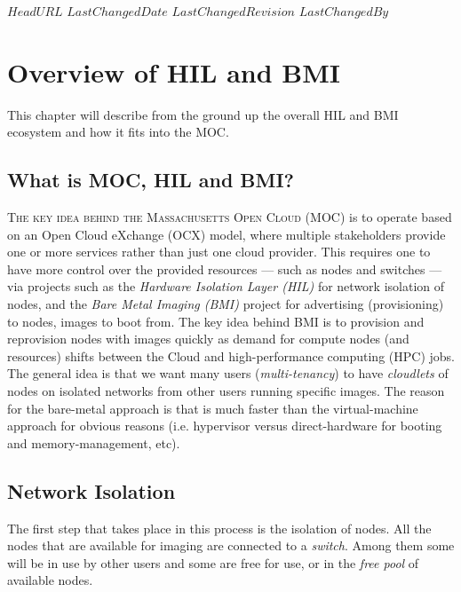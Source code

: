 \svnidlong
{$HeadURL$}
{$LastChangedDate$}
{$LastChangedRevision$}
{$LastChangedBy$}

\chapter{Overview of HIL and BMI}

\begin{introduction}
  This chapter will describe from the ground up the overall HIL and BMI ecosystem and how it fits into the MOC.
\end{introduction}


\section{What is MOC, HIL and BMI?}

\lettrine[nindent=-1pt]{T}{he key idea behind the Massachusetts Open Cloud (MOC)} is to operate based on an Open Cloud eXchange (OCX) model, where multiple stakeholders provide one or more services rather than just one cloud provider.  This requires one to have more control over the provided resources --- such as nodes and switches --- via projects such as the \emph{Hardware Isolation Layer (HIL)} for network isolation of nodes, and the \emph{Bare Metal Imaging (BMI)} project for advertising (provisioning) to nodes, images to boot from.  The key idea behind BMI is to provision and reprovision nodes with images quickly as demand for compute nodes (and resources) shifts between the Cloud and high-performance computing (HPC) jobs.  \\ %

The general idea is that we want many users (\emph{multi-tenancy}) to have \emph{cloudlets} of nodes on isolated networks from other users running specific images.  The reason for the bare-metal approach is that is much faster than the virtual-machine approach for obvious reasons (i.e. hypervisor versus direct-hardware for booting and memory-management, etc).


\section{Network Isolation}

The first step that takes place in this process is the isolation of nodes.  All the nodes that are available for imaging are connected to a \emph{switch}.  Among them some will be in use by other users and some are free for use, or in the \emph{free pool} of available nodes.  \\

